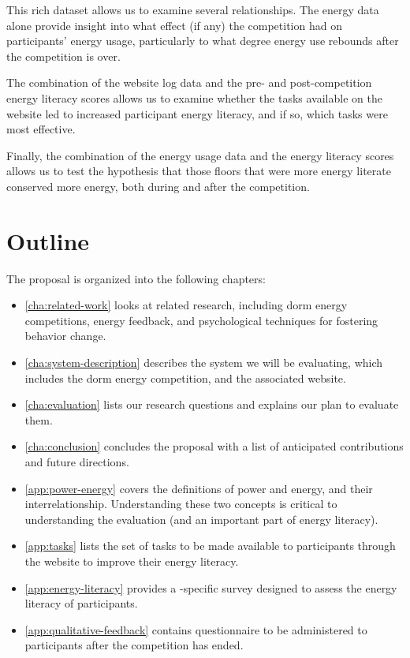 This rich dataset allows us to examine several relationships. The energy data alone provide insight into what effect (if any) the competition had on participants' energy usage, particularly to what degree energy use rebounds after the competition is over.

The combination of the website log data and the pre- and post-competition energy literacy scores allows us to examine whether the tasks available on the website led to increased participant energy literacy, and if so, which tasks were most effective.

Finally, the combination of the energy usage data and the energy literacy scores allows us to test the hypothesis that those floors that were more energy literate conserved more energy, both during and after the competition.


\section{Outline}

The proposal is organized into the following chapters:

\begin{itemize}
	\item \autoref{cha:related-work} looks at related research, including dorm energy competitions, energy feedback, and psychological techniques for fostering behavior change.
	\item \autoref{cha:system-description} describes the system we will be evaluating, which includes the dorm energy competition, and the associated website.
	\item \autoref{cha:evaluation} lists our research questions and explains our plan to evaluate them.
	\item \autoref{cha:conclusion} concludes the proposal with a list of anticipated contributions and future directions.
	\item \autoref{app:power-energy} covers the definitions of power and energy, and their interrelationship. Understanding these two concepts is critical to understanding the evaluation (and an important part of energy literacy).
	\item \autoref{app:tasks} lists the set of tasks to be made available to participants through the website to improve their energy literacy.
	\item \autoref{app:energy-literacy} provides a \Hawaii-specific survey designed to assess the energy literacy of participants.
	\item \autoref{app:qualitative-feedback} contains questionnaire to be administered to participants after the competition has ended.
\end{itemize}
